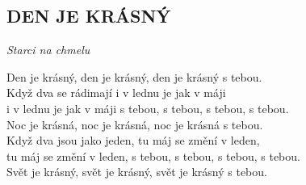 \begin{flushleft}
	\section*{\Huge DEN JE KRÁSNÝ}
	\emph{Starci na chmelu}
\end{flushleft}

Den je krásný, den je krásný, den je krásný s tebou.\\

Když dva se rádimají i v lednu je jak v máji\\
 i v lednu je jak v máji s tebou, s tebou, s tebou, s tebou.\\

Noc je krásná, noc je krásná, noc je krásná s tebou.\\
Když dva jsou jako jeden, tu máj se změní v leden,\\
tu máj se změní v leden, s tebou, s tebou, s tebou, s tebou.\\

Svět je krásný, svět je krásný, svět je krásný s tebou.

\newpage
